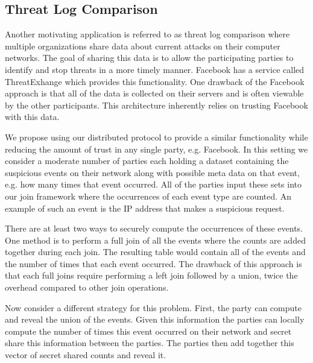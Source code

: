 
\subsection{Threat Log Comparison}\label{sec:threatlog}

Another motivating application is referred to as threat log comparison where multiple organizations share data about current attacks on their computer networks. The goal of sharing this data is to allow the participating parties to identify and stop threats in a more timely manner. Facebook has a service called ThreatExhange\cite{threat} which provides this functionality. One drawback of the Facebook approach is that all of the data is collected on their servers and is often viewable by the other participants. This architecture inherently relies on trusting Facebook with this data. 

We propose using our distributed protocol to provide a similar functionality while reducing the amount of trust in any single party, e.g. Facebook. In this setting we consider a moderate number of parties each holding a dataset containing the suspicious events on their network along with possible meta data on that event, e.g. how many times that event occurred. All of the parties input these sets into our join framework where the occurrences  of each event type are counted. An example of such an event is the IP address that makes a suspicious request. 

There are at least two ways to securely compute the occurrences of these events. One method is to perform a full join of all the events where the counts are added together during each join. The resulting table would contain all of the events and the number of times that each event occurred. The drawback of this approach is that each full joins require performing a left join followed by a union, twice the overhead compared to other join operations.

Now consider a different strategy for this problem.  First, the party can compute and reveal the union of the events. Given this information the parties can locally compute the number of times this event occurred on their network and secret share this information between the parties. The parties then add together this vector of secret shared counts and reveal it.

